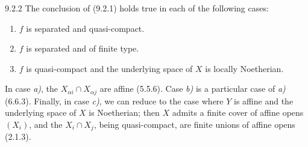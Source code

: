 \documentclass[../main.tex]{subfiles}
\begin{document}
\begin{cx}[Corollary]{9.2.2}
    The conclusion of {\normalfont(9.2.1)} holds true in each of the following cases:
    \begin{enumerate}[label=\alph*)]
        \item $f$ is separated and quasi-compact.
        \item $f$ is separated and of finite type.
        \item $f$ is quasi-compact and the underlying space of $X$ is locally Noetherian.
    \end{enumerate}
\end{cx}

In case \emph{a)}, the $X_{\alpha i}\cap X_{\alpha j}$ are affine (5.5.6).
Case \emph{b)} is a particular case of \emph{a)} (6.6.3).
Finally, in case \emph{c)}, we can reduce to the case where $Y$ is affine and the underlying space of $X$ is Noetherian; then $X$ admits a finite cover of affine opens $(X_i)$, and the $X_i\cap X_j$, being quasi-compact, are finite unions of affine opens (2.1.3).
\end{document}
